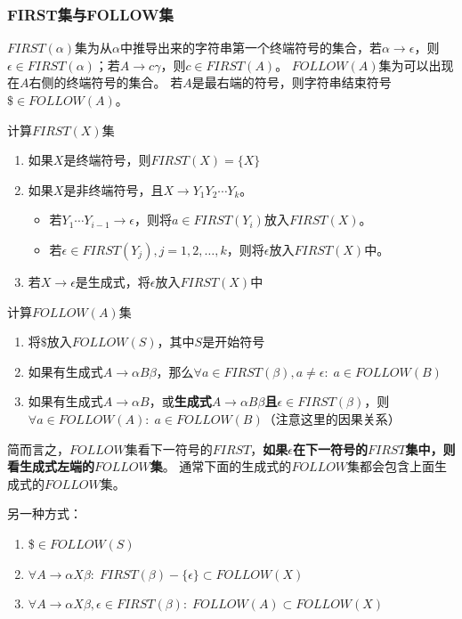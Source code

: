 \subsubsection{FIRST集与FOLLOW集}
\begin{definition}[FIRST集与FOLLOW集]
$FIRST(\alpha)$集为从$\alpha$中推导出来的字符串第一个终端符号的集合，若$\alpha\to\epsilon$，则$\epsilon\in FIRST(\alpha)$；若$A\to c\gamma$，则$c\in FIRST(A)$。
$FOLLOW(A)$集为可以出现在$A$右侧的终端符号的集合。
若$A$是最右端的符号，则字符串结束符号$\$\in FOLLOW(A)$。
\end{definition}

\begin{myalgorithm}
计算$FIRST(X)$集
\begin{enumerate}
	\item 如果$X$是终端符号，则$FIRST(X)=\{X\}$
	\item 如果$X$是非终端符号，且$X\to Y_1Y_2\cdots Y_k$。
\begin{itemize}
	\item 若$Y_1\cdots Y_{i-1}\to\epsilon$，则将$a\in FIRST(Y_i)$放入$FIRST(X)$。
	\item 若$\epsilon\in FIRST(Y_j),j=1,2,\ldots,k$，则将$\epsilon$放入$FIRST(X)$中。
\end{itemize}
	\item 若$X\to\epsilon$是生成式，将$\epsilon$放入$FIRST(X)$中
\end{enumerate}
\end{myalgorithm}

\begin{myalgorithm}
计算$FOLLOW(A)$集
\begin{enumerate}
	\item 将$\$$放入$FOLLOW(S)$，其中$S$是开始符号
	\item 如果有生成式$A\to\alpha B\beta$，那么$\forall a\in FIRST(\beta),a \ne\epsilon:\;a\in FOLLOW(B)$
	\item 如果有生成式$A\to\alpha B$，或\textbf{生成式$A\to\alpha B\beta$且$\epsilon\in FIRST(\beta)$}，则$\forall a\in FOLLOW(A):\;a\in FOLLOW(B)$（注意这里的因果关系）
\end{enumerate}
\end{myalgorithm}

简而言之，$FOLLOW$集看下一符号的$FIRST$，\textbf{如果$\epsilon$在下一符号的$FIRST$集中，则看生成式左端的$FOLLOW$集}。
通常下面的生成式的$FOLLOW$集都会包含上面生成式的$FOLLOW$集。

另一种方式：
\begin{enumerate}
	\item \$$\in FOLLOW(S)$
	\item $\forall A\to\alpha X\beta:\;FIRST(\beta)-\{\epsilon\}\subset FOLLOW(X)$
	\item $\forall A\to\alpha X\beta,\epsilon\in FIRST(\beta):\;FOLLOW(A)\subset FOLLOW(X)$
\end{enumerate}

